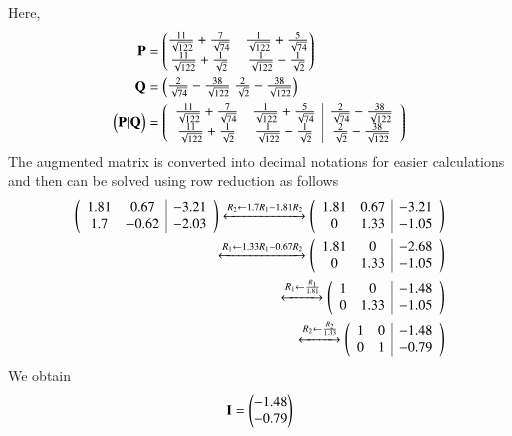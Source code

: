 \documentclass[journal,12pt,twocolumn]{IEEEtran}
\begin{document}
\begin{flushleft}
Here,
\begin{align}
\mathbf{P}&=\begin{pmatrix}
\frac{11}{\sqrt{122}}+\frac{7}{\sqrt{74}} & \frac{1}{\sqrt{122}}+\frac{5}{\sqrt{74}}\\
\frac{11}{\sqrt{122}}+\frac{1}{\sqrt{2}} & \frac{1}{\sqrt{122}}-\frac{1}{\sqrt{2}}\\
\end{pmatrix}\\
\mathbf{Q}&=\begin{pmatrix}
\frac{2}{\sqrt{74}}-\frac{38}{\sqrt{122}}\
\frac{2}{\sqrt{2}}-\frac{38}{\sqrt{122}}\\
\end{pmatrix}\\
\begin{pmatrix}\mathbf{P}|\mathbf{Q}\end{pmatrix} 
 &= \begin{pmatrix}
\begin{array}{cc|c}
\frac{11}{\sqrt{122}}+\frac{7}{\sqrt{74}} & \frac{1}{\sqrt{122}}+\frac{5}{\sqrt{74}} & \frac{2}{\sqrt{74}}-\frac{38}{\sqrt{122}} \\
\frac{11}{\sqrt{122}}+\frac{1}{\sqrt{2}} & \frac{1}{\sqrt{122}}-\frac{1}{\sqrt{2}} & \frac{2}{\sqrt{2}}-\frac{38}{\sqrt{122}} \\
\end{array}
\end{pmatrix}
\end{align}
The augmented matrix is converted into decimal notations for easier calculations and then can be solved using row reduction as follows \\
\begin{align}
\begin{pmatrix}
\begin{array}{cc|c}
1.81 & 0.67 & -3.21 \\
 1.7 & -0.62 & -2.03\\
\end{array}
\end{pmatrix}
 \xleftrightarrow[]{R_2\leftarrow 1.7R_1-1.81R_2}
\begin{pmatrix}
\begin{array}{cc|c}
1.81 & 0.67 & -3.21 \\
0 & 1.33 & -1.05\\
\end{array}
\end{pmatrix}\\
\xleftrightarrow[]{R_1\leftarrow 1.33R_1-0.67R_2}
\begin{pmatrix}
\begin{array}{cc|c}
1.81 & 0 & -2.68 \\
0 & 1.33 & -1.05\\
\end{array}
\end{pmatrix}\\
\xleftrightarrow[]{R_1\leftarrow \frac{R_1}{1.81}}
\begin{pmatrix}
\begin{array}{cc|c}
1 & 0 & -1.48 \\
0 & 1.33 & -1.05\\
\end{array}
\end{pmatrix}\\
\xleftrightarrow[]{R_2\leftarrow \frac{R_2}{1.33}}
\begin{pmatrix}
\begin{array}{cc|c}
1 & 0 & -1.48 \\
0 & 1 & -0.79\\
\end{array}
\end{pmatrix}
\end{align}
We obtain 
\begin{align}
\mathbf{I}=\begin{pmatrix}-1.48\\-0.79\end{pmatrix}
\end{align}


\end{flushleft}
\end{document}
